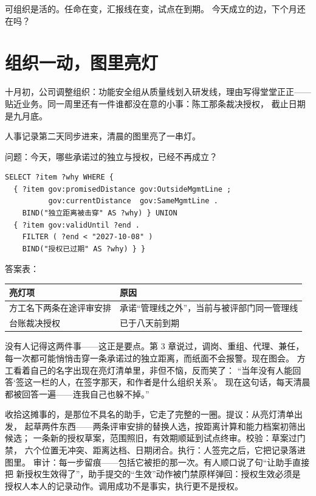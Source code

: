 可组织是活的。任命在变，汇报线在变，试点在到期。
今天成立的边，下个月还在吗？

\section{组织一动，图里亮灯}

十月初，公司调整组织：功能安全组从质量线划入研发线，理由写得堂堂正正——
贴近业务。同一周里还有一件谁都没在意的小事：陈工那条裁决授权，
截止日期是九月底。

人事记录第二天同步进来，清晨的图里亮了一串灯。

问题：今天，哪些承诺过的独立与授权，已经不再成立？

\nopagebreak[4]
\begin{codebox}
\begin{Verbatim}[fontsize=\small,breaklines=true,breakanywhere=true,breaksymbolleft={},breaksymbolright={}]
SELECT ?item ?why WHERE {
  { ?item gov:promisedDistance gov:OutsideMgmtLine ;
          gov:currentDistance  gov:SameMgmtLine .
    BIND("独立距离被击穿" AS ?why) } UNION
  { ?item gov:validUntil ?end .
    FILTER ( ?end < "2027-10-08" )
    BIND("授权已过期" AS ?why) } }
\end{Verbatim}
\end{codebox}

答案表：

\begin{center}
\begingroup\small
\setlength{\tabcolsep}{4pt}
\begin{tabularx}{\linewidth}{@{}XX@{}}
\toprule
亮灯项 & 原因 \\
\midrule
方工名下两条在途评审安排 & 承诺“管理线之外”，当前与被评部门同一管理线 \\
台账裁决授权 & 已于八天前到期 \\
\bottomrule
\end{tabularx}
\endgroup
\end{center}

没有人记得这两件事——这正是要点。第 3 章说过，调岗、重组、代理、兼任，
每一次都可能悄悄击穿一条承诺过的独立距离，而纸面不会报警。现在图会。
方工看着自己的名字出现在亮灯清单里，非但不恼，反而笑了：
“当年没有人能回答‘签这一栏的人，在签字那天，和作者是什么组织关系’。
现在这句话，每天清晨都被回答一遍——连我自己也躲不掉。”

收拾这摊事的，是那位不具名的助手，它走了完整的一圈。提议：从亮灯清单出发，
起草两件东西——两条评审安排的替换人选，按距离计算和能力档案初筛出候选；
一条新的授权草案，范围照旧，有效期顺延到试点终审。校验：草案过门禁，
六个位置无冲突、距离达档、日期闭合。执行：人签完之后，它把记录落进图里。
审计：每一步留痕——包括它被拒的那一次。有人顺口说了句“让助手直接把
新授权生效得了”，助手提交的“生效”动作被门禁原样弹回：授权生效必须是
授权人本人的记录动作。调用成功不是事实，执行更不是授权。

